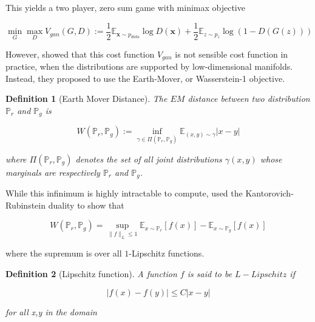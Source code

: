 \documentclass[]{article}
\newtheorem{definition}{Definition}[section]
\theoremstyle{definition}
\begin{document}
This yields a two player, zero sum game with minimax objective

\begin{equation}
    \min_G \max_D V_{gan}(G,D):=\frac{1}{2} \mathbb{E}_{\mathbf{x} \sim p_{data}} \log D(\mathbf{x})+\frac{1}{2} \mathbb{E}_{z \sim p_{z}} \log (1-D(G(z)))
\end{equation}


However, \cite{ACB17} showed that this cost function $V_{gan}$ is not sensible cost function in practice, when the distributions are supported by low-dimensional manifolds. Instead, they proposed to use the Earth-Mover, or Wasserstein-1 objective.

    \begin{definition}[Earth Mover Distance]
        The $EM$ distance between two distribution $\mathbb{P}_r$ and $\mathbb{P}_g$ is 

        \begin{equation}
            W(\mathbb{P}_r, \mathbb{P}_g):=\inf _{\gamma \in \Pi\left(\mathbb{P}_r, \mathbb{P}_g\right)} \mathbb{E}_{(x, y) \sim \gamma}|x-y|
        \end{equation}

        where $\Pi\left(\mathbb{P}_r, \mathbb{P}_g\right)$ denotes the set of all joint distributions $\gamma(x,y)$ whose marginals are respectively  $\mathbb{P}_r$ and $\mathbb{P}_g$.
    \end{definition}

    While this infinimum is highly intractable to compute, \cite{ACB17} used the Kantorovich-Rubinstein duality \cite{Vil08} to show that

    \begin{equation}
        W(\mathbb{P}_r, \mathbb{P}_g) = \sup _{\|f\|_L \leq 1} \mathbb{E}_{x\sim \mathbb{P}_r}[f(x)] - \mathbb{E}_{x\sim \mathbb{P}_g}[f(x)]
    \end{equation}

    where the supremum is over all $1$-Lipschitz functions.

    \begin{definition}[Lipschitz function]
        A function $f$ is said to be $L-Lipschitz$ if 

        \begin{equation}
            |f(x) - f(y)| \leq C|x-y|
        \end{equation}

        for all x,y in the domain
    \end{definition}
    
\end{document}
